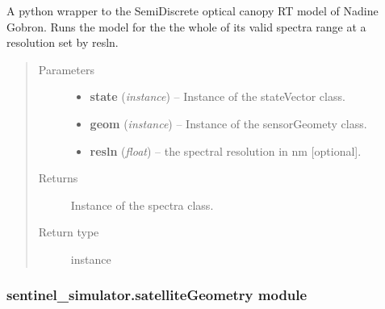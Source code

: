 \documentclass[letterpaper,10pt,english]{sphinxmanual}
\begin{document}
\begin{fulllineitems}
\label{source/sentinel_simulator:sentinel_simulator.opticalCanopyRT.canopyRTOptical}
A python wrapper to the SemiDiscrete optical
canopy RT model of Nadine Gobron. Runs the
model for the the whole of its valid spectra
range at a resolution set by resln.
\begin{quote}\begin{description}
\item[{Parameters}] \leavevmode\begin{itemize}
\item {} 
\textbf{state} (\emph{instance}) -- Instance of the stateVector class.

\item {} 
\textbf{geom} (\emph{instance}) -- Instance of the sensorGeomety class.

\item {} 
\textbf{resln} (\emph{float}) -- the spectral resolution in nm {[}optional{]}.

\end{itemize}

\item[{Returns}] \leavevmode
Instance of the spectra class.

\item[{Return type}] \leavevmode
instance

\end{description}\end{quote}

\end{fulllineitems}



\subsubsection{sentinel\_simulator.satelliteGeometry module}
\label{source/sentinel_simulator:module-sentinel_simulator.satelliteGeometry}\label{source/sentinel_simulator:sentinel-simulator-satellitegeometry-module}
\end{document}
